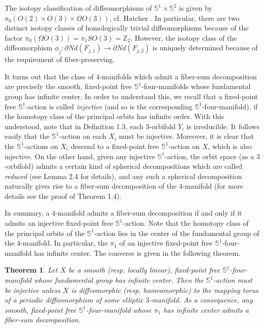 \documentclass[11pt]{amsart}
\theoremstyle{plain}
\newtheorem{theorem}{Theorem}
\numberwithin{theorem}{section}
\theoremstyle{definition}
\begin{document}
 The isotopy classification of diffeomorphisms of ${{\mathbb S}}^1\times {{\mathbb S}}^2$ is given
by $\pi_0(O(2)\times O(3)\times \Omega O(3))$, cf. Hatcher \cite{Hat}. In particular, there are two
distinct isotopy classes of homologically trivial diffeomorphisms because of the factor 
$\pi_0(\Omega O(3))=\pi_1 SO(3)={{\mathbb Z}}_2$. However, the isotopy class of
the diffeomorphism $\phi_j:\partial Nd(F_{j,1})\rightarrow \partial Nd(F_{j,2})$ is uniquely determined 
because of the requirement of fiber-preserving.

\vspace{2mm}

It turns out that the class of $4$-manifolds which admit a fiber-sum decomposition are precisely 
the smooth, fixed-point free ${{\mathbb S}}^1$-four-manifolds whose fundamental group has infinite center. 
In order to understand this, we recall that a fixed-point free ${{\mathbb S}}^1$-action is called {\it injective} 
(and so is the corresponding ${{\mathbb S}}^1$-four-manifold), if the homotopy class of the principal orbits 
has infinite order. With this understood, note that in Definition 1.3, each $3$-orbifold $Y_i$ is 
irreducible. It follows easily that the ${{\mathbb S}}^1$-action on each $X_i$ must be injective. Moreover, 
it is clear that the ${{\mathbb S}}^1$-actions on $X_i$ descend to a fixed-point free ${{\mathbb S}}^1$-action 
on $X$, which is also injective. On the other hand, given any injective ${{\mathbb S}}^1$-action, the orbit
space (as a $3$-orbifold) admits a certain kind of spherical decompositions which are called 
{\it reduced} (see Lemma 2.4 for details), and any such a spherical decomposition naturally 
gives rise to a fiber-sum decomposition of the $4$-manifold (for more details see the proof of
Theorem 1.4). 

In summary, a $4$-manifold admits a fiber-sum decomposition if and only if it admits an injective 
fixed-point free ${{\mathbb S}}^1$-action. Note that the homotopy class of the principal orbits of the ${{\mathbb S}}^1$-action
lies in the center of the fundamental group of the $4$-manifold. In particular, the $\pi_1$ of an injective 
fixed-point free ${{\mathbb S}}^1$-four-manifold has infinite center. The converse is given in the following theorem. 

\begin{theorem}
Let $X$ be a smooth (resp. locally linear), fixed-point free ${{\mathbb S}}^1$-four-manifold whose 
fundamental group has infinite center. Then the ${{\mathbb S}}^1$-action must be injective unless 
$X$ is diffeomorphic (resp. homeomorphic) to the mapping torus of a periodic diffeomorphism 
of some elliptic $3$-manifold. As a consequence, any smooth, fixed-point free ${{\mathbb S}}^1$-four-manifold 
whose $\pi_1$ has infinite center admits a fiber-sum decomposition. 
\end{theorem}
\end{document}
